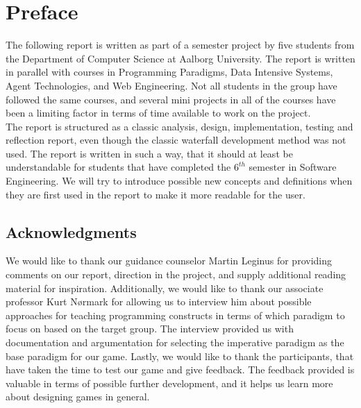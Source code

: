 \chapter*{Preface}

The following report is written as part of a semester project by five students from the Department of Computer Science at Aalborg University. The report is written in parallel with courses in Programming Paradigms, Data Intensive Systems, Agent Technologies, and Web Engineering. Not all students in the group have followed the same courses, and several mini projects in all of the courses have been a limiting factor in terms of time available to work on the project.\\

The report is structured as a classic analysis, design, implementation, testing and reflection report, even though the classic waterfall development method was not used. The report is written in such a way, that it should at least be understandable for students that have completed the $6^{th}$ semester in Software Engineering. We will try to introduce possible new concepts and definitions when they are first used in the report to make it more readable for the user.

\section*{Acknowledgments}

We would like to thank our guidance counselor Martin Leginus for providing comments on our report, direction in the project, and supply additional reading material for inspiration.
Additionally, we would like to thank our associate professor Kurt N{\o}rmark for allowing us to interview him about possible approaches for teaching programming constructs in terms of which paradigm to focus on based on the target group.
The interview provided us with documentation and argumentation for selecting the imperative paradigm as the base paradigm for our game.
Lastly, we would like to thank the participants, that have taken the time to test our game and give feedback.
The feedback provided is valuable in terms of possible further development, and it helps us learn more about designing games in general.
